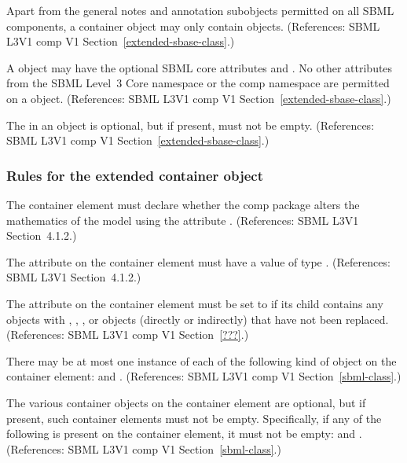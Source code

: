 \begin{sbmlenum}
 { Apart from the general notes and annotation
  subobjects permitted on all SBML components, a \ListOfReplacedElements
  container object may only contain \ReplacedElement objects. 
  (References: SBML L3V1 comp V1 Section~\ref{extended-sbase-class}.) }


 { A \ListOfReplacedElements object may have the optional 
  SBML core attributes  and .  No other attributes 
  from the SBML Level~3 Core namespace or the comp namespace are permitted on 
  a \ListOfReplacedElements object. 
  (References: SBML L3V1 comp V1 Section~\ref{extended-sbase-class}.) }


 { The \ListOfReplacedElements in an \SBase object is
  optional, but if present, must not be empty.
  (References: SBML L3V1 comp V1 Section~\ref{extended-sbase-class}.) }


\end{sbmlenum} \subsubsection*{Rules for the extended  container object} \begin{sbmlenum}

 { The  container element must declare whether 
  the comp package alters the mathematics of the model using the attribute
  .  
  (References: SBML L3V1 Section~4.1.2.) }
  

 { The attribute  on the  
  container element must have a value of type .  
  (References: SBML L3V1 Section~4.1.2.) }
  

 { The attribute  on the  
  container element must be set to  if its
  \Model child contains any \Submodel objects with \Species, \Parameter,
  \Reaction, or \Event objects (directly or indirectly) that have not been
  replaced. 
  (References: SBML L3V1 comp V1 Section~\ref{???}.) }


 { There may be at most one instance of each of the
  following kind of object on the  container element:  
  \ListOfModelDefinitions and \ListOfExternalModelDefinitions. 
  (References: SBML L3V1 comp V1 Section~\ref{sbml-class}.) }


 { The various  container objects on 
  the  container element are optional, but if present, such 
  container elements must not be empty. Specifically, if any of the following 
  is present on the  container element, it must not be empty: 
  \ListOfModelDefinitions and \ListOfExternalModelDefinitions.
  (References: SBML L3V1 comp V1 Section~\ref{sbml-class}.) }
  


\end{sbmlenum}
